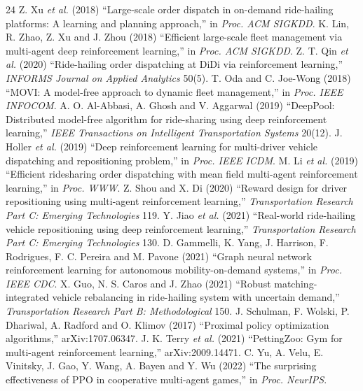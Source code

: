 \documentclass[3p,times,procedia]{elsarticle}
\begin{document}
\setlength{\bibsep}{2pt plus 0.3ex}
\begin{thebibliography}{24}
 Z. Xu \emph{et al.} (2018) ``Large-scale order dispatch in on-demand ride-hailing platforms: A learning and planning approach,'' in \emph{Proc. ACM SIGKDD}.
 K. Lin, R. Zhao, Z. Xu and J. Zhou (2018) ``Efficient large-scale fleet management via multi-agent deep reinforcement learning,'' in \emph{Proc. ACM SIGKDD}.
 Z. T. Qin \emph{et al.} (2020) ``Ride-hailing order dispatching at DiDi via reinforcement learning,'' \emph{INFORMS Journal on Applied Analytics} 50(5).
 T. Oda and C. Joe-Wong (2018) ``MOVI: A model-free approach to dynamic fleet management,'' in \emph{Proc. IEEE INFOCOM}.
 A. O. Al-Abbasi, A. Ghosh and V. Aggarwal (2019) ``DeepPool: Distributed model-free algorithm for ride-sharing using deep reinforcement learning,'' \emph{IEEE Transactions on Intelligent Transportation Systems} 20(12).
 J. Holler \emph{et al.} (2019) ``Deep reinforcement learning for multi-driver vehicle dispatching and repositioning problem,'' in \emph{Proc. IEEE ICDM}.
 M. Li \emph{et al.} (2019) ``Efficient ridesharing order dispatching with mean field multi-agent reinforcement learning,'' in \emph{Proc. WWW}.
 Z. Shou and X. Di (2020) ``Reward design for driver repositioning using multi-agent reinforcement learning,'' \emph{Transportation Research Part C: Emerging Technologies} 119.
 Y. Jiao \emph{et al.} (2021) ``Real-world ride-hailing vehicle repositioning using deep reinforcement learning,'' \emph{Transportation Research Part C: Emerging Technologies} 130.
 D. Gammelli, K. Yang, J. Harrison, F. Rodrigues, F. C. Pereira and M. Pavone (2021) ``Graph neural network reinforcement learning for autonomous mobility-on-demand systems,'' in \emph{Proc. IEEE CDC}.
 X. Guo, N. S. Caros and J. Zhao (2021) ``Robust matching-integrated vehicle rebalancing in ride-hailing system with uncertain demand,'' \emph{Transportation Research Part B: Methodological} 150.
 J. Schulman, F. Wolski, P. Dhariwal, A. Radford and O. Klimov (2017) ``Proximal policy optimization algorithms,'' arXiv:1707.06347.
 J. K. Terry \emph{et al.} (2021) ``PettingZoo: Gym for multi-agent reinforcement learning,'' arXiv:2009.14471.
 C. Yu, A. Velu, E. Vinitsky, J. Gao, Y. Wang, A. Bayen and Y. Wu (2022) ``The surprising effectiveness of PPO in cooperative multi-agent games,'' in \emph{Proc. NeurIPS}.

\end{thebibliography}
\end{document}
